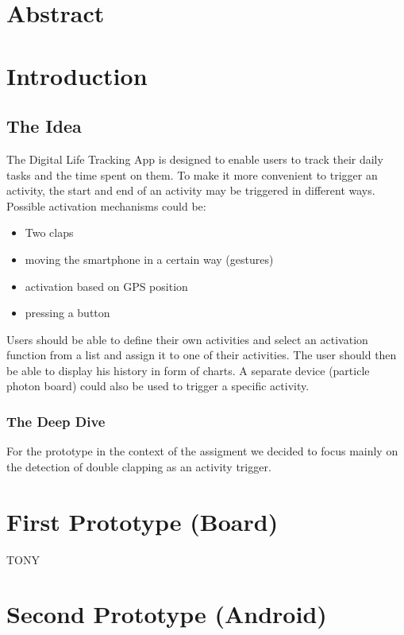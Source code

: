 \documentclass
[
 12pt, %
       DIV12,
       a4paper,
       oneside,
       titlepage,
       parskip=half,
       headings=normal,
       listof=totoc,
       bibliography=totoc,
       index=totoc,
       captions=tableheading,
       ]{scrreprt}
\author{Dennis Müller}
\date{\today}
\title{}
\begin{document}
\tableofcontents


\chapter{Abstract}
\label{sec:orgd639853}
\chapter{Introduction}
\label{sec:org7d7a9e6}
\section{The Idea}
\label{sec:org0041e00}

The Digital Life Tracking App is designed to enable users to track their daily tasks and the time spent on them.
To make it more convenient to trigger an activity, the start and end of an activity may be triggered in different ways. 
Possible activation mechanisms could be:
\begin{itemize}
\item Two claps
\item moving the smartphone in a certain way (gestures)
\item activation based on GPS position
\item pressing a button
\end{itemize}

Users should be able to define their own activities and select an activation function from a list and assign it to one of their activities.
The user should then be able to display his history in form of charts.
A separate device (particle photon board) could also be used to trigger a specific activity.

\subsection{The Deep Dive}
\label{sec:orgf0412a9}
For the prototype in the context of the assigment we decided to focus mainly on the detection of double clapping as an activity trigger.



\chapter{First Prototype (Board)}
\label{sec:org93ace6f}
TONY
\chapter{Second Prototype (Android)}
\label{sec:org11f3563}
\end{document}
